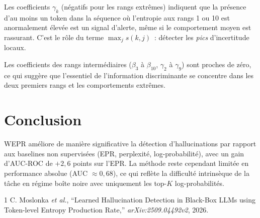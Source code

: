 \documentclass[11pt,a4paper]{article}
\begin{document}
Les coefficients $\gamma_k$ (négatifs pour les rangs extrêmes) indiquent que la présence d'au moins un token dans la séquence où l'entropie aux rangs 1 ou 10 est anormalement élevée est un signal d'alerte, même si le comportement moyen est rassurant. C'est le rôle du terme $\max_j s(k,j)$~: détecter les \emph{pics} d'incertitude locaux.

Les coefficients des rangs intermédiaires ($\beta_3$ à $\beta_{10}$, $\gamma_2$ à $\gamma_9$) sont proches de zéro, ce qui suggère que l'essentiel de l'information discriminante se concentre dans les deux premiers rangs et les comportements extrêmes.

\section{Conclusion}

WEPR améliore de manière significative la détection d'hallucinations par rapport aux baselines non supervisées (EPR, perplexité, log-probabilité), avec un gain d'AUC-ROC de $+2{,}6$ points sur l'EPR. La méthode reste cependant limitée en performance absolue (AUC $\approx 0{,}68$), ce qui reflète la difficulté intrinsèque de la tâche en régime boîte noire avec uniquement les top-$K$ log-probabilités.

\begin{thebibliography}{1}
 C. Moslonka \emph{et al.}, ``Learned Hallucination Detection in Black-Box LLMs using Token-level Entropy Production Rate,'' \emph{arXiv:2509.04492v2}, 2026.
\end{thebibliography}
\end{document}

